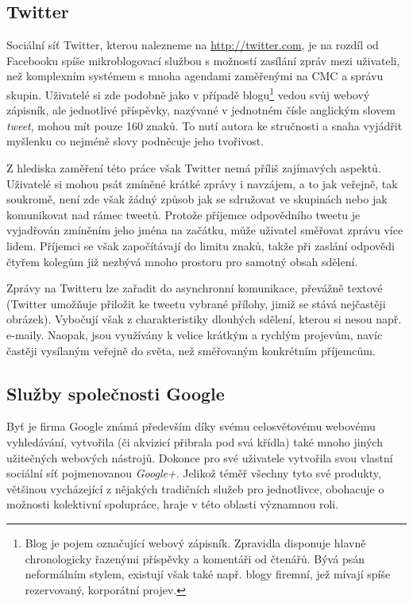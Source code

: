 \documentclass[12pt,oneside,final]{fithesis2}
\begin{document}
\subsection{Twitter}\label{twitter}
Sociální síť Twitter, kterou nalezneme na \url{http://twitter.com}, je na rozdíl od Facebooku spíše mikroblogovací službou s možností zasílání zpráv mezi uživateli, než komplexním systémem s mnoha agendami zaměřenými na CMC a správu skupin. Uživatelé si zde podobně jako v případě blogu\footnote{Blog je pojem označující webový zápisník. Zpravidla disponuje hlavně chronologicky řazenými příspěvky a komentáři od čtenářů. Bývá psán neformálním stylem, existují však také např. blogy firemní, jež mívají spíše rezervovaný, korporátní projev.} vedou svůj webový zápisník, ale jednotlivé příspěvky, nazývané v jednotném čísle anglickým slovem \emph{tweet}, mohou mít pouze 160 znaků. To nutí autora ke stručnosti a snaha vyjádřit myšlenku co nejméně slovy podněcuje jeho tvořivost.

Z hlediska zaměření této práce však Twitter nemá příliš zajímavých aspektů. Uživatelé si mohou psát zmíněné krátké zprávy i navzájem, a to jak veřejně, tak soukromě, není zde však žádný způsob jak se sdružovat ve skupinách nebo jak komunikovat nad rámec tweetů. Protože příjemce odpovědního tweetu je vyjadřován zmíněním jeho jména na začátku, může uživatel směřovat zprávu více lidem. Příjemci se však započítávají do limitu znaků, takže při zaslání odpovědi čtyřem kolegům již nezbývá mnoho prostoru pro samotný obsah sdělení.

Zprávy na Twitteru lze zařadit do asynchronní komunikace, převážně textové (Twitter umožňuje přiložit ke tweetu vybrané přílohy, jimiž se stává nejčastěji obrázek). Vybočují však z charakteristiky dlouhých sdělení, kterou si nesou např. e-maily. Naopak, jsou využívány k velice krátkým a rychlým projevům, navíc častěji vysílaným veřejně do světa, než směřovaným konkrétním příjemcům.

\subsection{Služby společnosti Google}\label{google}
Byť je firma Google známá především díky svému celosvětovému webovému vyhledávání, vytvořila (či akvizicí přibrala pod svá křídla) také mnoho jiných užitečných webových nástrojů. Dokonce pro své uživatele vytvořila svou vlastní sociální síť pojmenovanou \emph{Google+}. Jelikož téměř všechny tyto své produkty, většinou vycházející z nějakých tradičních služeb pro jednotlivce, obohacuje o možnosti kolektivní spolupráce, hraje v této oblasti významnou roli.
\end{document}
